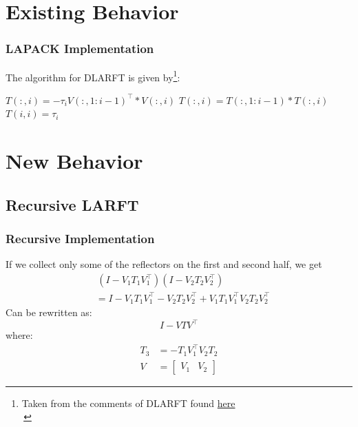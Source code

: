 \documentclass[12pt]{beamer}
\begin{document}
    \section{Existing Behavior}
    \begin{frame}
        \frametitle{LAPACK Implementation}
        The algorithm for DLARFT is given by\footnote{Taken from the comments of DLARFT found \textcolor{blue}{\href{https://netlib.org/lapack/explore-html//dd/daa/dlarft_8f_source.html}{here}}\\\,}:
        \begin{algorithmic}
                \State $T(:,i) = -\tau_i V(:,1:i-1)^\top * V(:,i)$
                \State $T(:,i) = T(:,1:i-1) * T(:,i)$
                \State $T(i,i) = \tau_i$
            \EndFor
        \end{algorithmic}

    \end{frame}
    \section{New Behavior}
    \subsection{Recursive LARFT}
    \begin{frame}
        \frametitle{Recursive Implementation}
        If we collect only some of the reflectors on the first and second half, we get
        \begin{align*}
            &\,(I - V_1T_1V_1^\top)(I - V_2T_2V_2^\top) \\
            &= I - V_1T_1V_1^\top - V_2T_2V_2^\top + V_1T_1V_1^\top V_2T_2V_2^\top
        \end{align*}
        Can be rewritten as:
        $$
            I - VTV^\top
        $$
        where:
        \begin{align*}
            T_3 &= -T_1V_1^\top V_2T_2 \\
            V &= \begin{bmatrix}
                V_1 & V_2
            \end{bmatrix}
        \end{align*}
    \end{frame}
\end{document}

